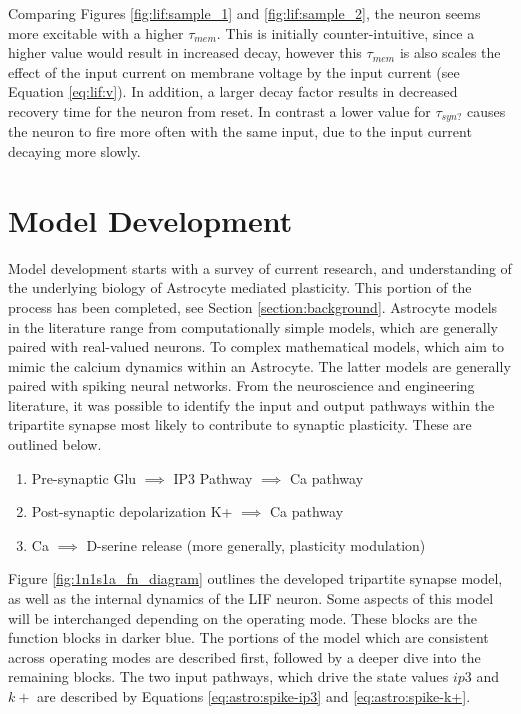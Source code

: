     Comparing Figures \ref{fig:lif:sample_1} and \ref{fig:lif:sample_2}, the
    neuron seems more excitable with a higher $\tau_{mem}$. This is initially
    counter-intuitive, since a higher value would result in increased decay,
    however this $\tau_{mem}$ is also scales the effect of the input current on
    membrane voltage by the input current (see Equation \ref{eq:lif:v}). In
    addition, a larger decay factor results in decreased recovery time for the
    neuron from reset. In contrast a lower value for $\tau_{syn?}$ causes the
    neuron to fire more often with the same input, due to the input current
    decaying more slowly.


    \section{Model Development}
    
    Model development starts with a survey of current research, and
    understanding of the underlying biology of Astrocyte mediated
    plasticity. This portion of the process has been completed, see Section
    \ref{section:background}. Astrocyte models in the literature range from
    computationally simple models, which are generally paired with real-valued
    neurons. To complex mathematical models, which aim to mimic the calcium
    dynamics within an Astrocyte. The latter models are generally paired with
    spiking neural networks. From the neuroscience and engineering literature,
    it was possible to identify the input and output pathways within the
    tripartite synapse most likely to contribute to synaptic plasticity. These
    are outlined below.

    \begin{enumerate}
        \item Pre-synaptic Glu $\implies$ IP3 Pathway $\implies$ Ca pathway
        \item Post-synaptic depolarization K+ $\implies$ Ca pathway
        \item Ca $\implies$ D-serine release (more generally, plasticity modulation)
    \end{enumerate}


    Figure \ref{fig:1n1s1a_fn_diagram} outlines the developed tripartite synapse
    model, as well as the internal dynamics of the LIF neuron. Some aspects of
    this model will be interchanged depending on the operating mode. These
    blocks are the function blocks in darker blue. The portions of the model
    which are consistent across operating modes are described first, followed by
    a deeper dive into the remaining blocks. The two input pathways, which drive
    the state values $ip3$ and $k+$ are described by Equations
    \ref{eq:astro:spike-ip3} and \ref{eq:astro:spike-k+}.

